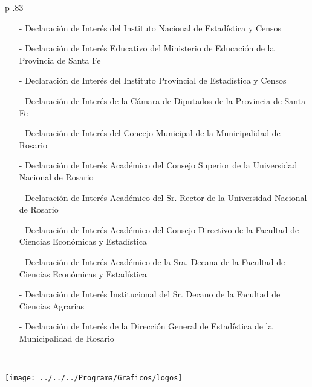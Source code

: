 \documentclass[12pt,twoside,a4paper]{article}
\renewcommand{\headrulewidth}{0.4pt}
\renewcommand{\footrulewidth}{0.4pt}
\newcommand{\Footer}{17 al 20 de octubre 2017. Rosario, Argentina}
\newcommand{\SetHeader}[2]{
	\fancyhead{}
	\fancyhead[LE,RO]{\textit{#1}}
	\fancyhead[RE,LO]{ #2}
	\fancyfoot{}
	\fancyfoot[LE,RO]{\thepage}
	\fancyfoot[RE,LO]{\small{\Footer}}
	\renewcommand{\headrulewidth}{0.4pt}
	\renewcommand{\footrulewidth}{0.4pt}
}
\begin{document}
\begin{longtable}{ p {.83\textwidth}}  

\begin{itemize}
\item[-] Declaración de Interés del Instituto Nacional de Estadística y Censos
\item[-] Declaración de Interés Educativo del Ministerio de Educación de la Provincia de Santa Fe
\item[-] Declaración de Interés del Instituto Provincial de Estadística y Censos
\item[-] Declaración de Interés de la Cámara de Diputados de la Provincia de Santa Fe
\item[-] Declaración de Interés del Concejo Municipal de la Municipalidad de Rosario
\item[-] Declaración de Interés Académico del Consejo Superior de la Universidad Nacional de Rosario
\item[-] Declaración de Interés Académico del Sr. Rector de la Universidad Nacional de Rosario
\item[-] Declaración de Interés Académico del Consejo Directivo de la Facultad de Ciencias Económicas y Estadística
\item[-] Declaración de Interés Académico de la Sra. Decana de la Facultad de Ciencias Económicas y Estadística
\item[-] Declaración de Interés Institucional del Sr. Decano de la Facultad de Ciencias Agrarias
\item[-] Declaración de Interés de la Dirección General de Estadística de la Municipalidad de Rosario
\end{itemize}\\
\end{longtable}


\newpage
\thispagestyle{empty}




\newpage
\noindent
\thispagestyle{empty}

\vspace*{1cm}
\begin{center} \setlength{\unitlength}{1cm}
	\noindent
  \texttt{[image: ../../../Programa/Graficos/logos]}
\end{center}
\end{document}
